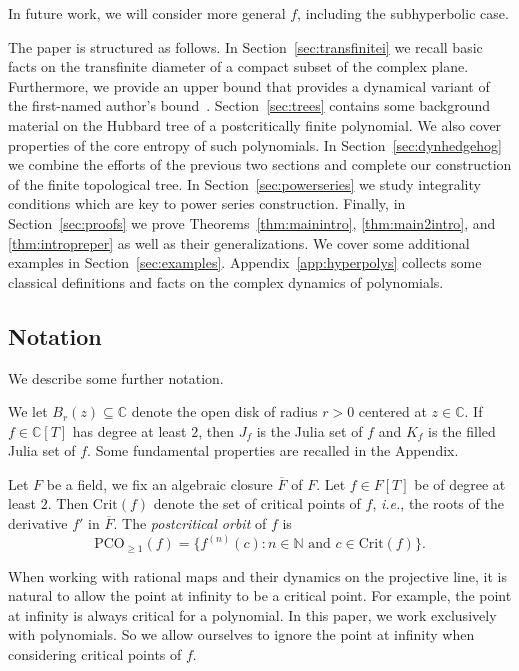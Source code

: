 \documentclass[12pt,oneside,a4]{amsart}
\newcommand{\IC}{\mathbb{C}}
\newcommand{\IN}{\mathbb{N}}
\numberwithin{maincounter}{section}
\numberwithin{equation}{section}
\renewcommand{\subset}{\subseteq}
\newcommand{\crit}[1]{\mathrm{Crit}({#1})}
\newcommand{\pco}{\mathrm{PCO}}
\begin{document}
In future work, we will consider more general $f$, including the
subhyperbolic case.


The paper is structured as follows. In Section~\ref{sec:transfinitei}
we recall basic facts on the transfinite diameter of a compact subset
of the complex plane. Furthermore, we provide an upper bound that
provides a dynamical variant of the first-named author's
bound~\cite{hab:dubinin}. Section~\ref{sec:trees} contains some
background material on the Hubbard tree of a postcritically finite
polynomial. We also cover properties of the core entropy of such
polynomials. In Section~\ref{sec:dynhedgehog} we combine the efforts
of the previous two sections and complete our construction of the
finite topological tree. In Section~\ref{sec:powerseries} we study
integrality conditions which are key to power series construction.
Finally, in Section~\ref{sec:proofs} we prove
Theorems~\ref{thm:mainintro}, \ref{thm:main2intro}, and
\ref{thm:intropreper}
as well as their
generalizations. We cover some additional examples in
Section~\ref{sec:examples}.
Appendix~\ref{app:hyperpolys} collects some classical
definitions and facts on the complex dynamics of polynomials.

\subsection{Notation}
\label{sec:notation}

We describe some further notation.

We let $B_r(z)\subset\IC$ denote the open disk of radius $r>0$
centered at $z\in\IC$.
If $f\in\IC[T]$ has degree at least $2$, then $J_f$ is the Julia set
of $f$ and $K_f$ is the filled Julia set of $f$. Some fundamental
properties are recalled in the Appendix. 


Let $F$ be a field, we  fix an algebraic closure $\overline F$ of $F$.
Let $f\in F[T]$ be of degree at least $2$.  Then $\crit{f}$
denote the set of critical points of $f$, \textit{i.e.}, the roots of
the derivative $f'$ in $\overline F$. The \textit{postcritical
orbit} of $f$ is
\begin{equation}
  \label{def:pcoge1}
  \pco_{\ge 1}(f) = \{f^{(n)}(c) : n\in \IN\text{ and } c\in \crit{f}\}.
\end{equation}

When working with rational maps and their dynamics on the projective
line, it is natural to allow the point at infinity to be a critical
point. For example, the point at infinity is always critical for a
polynomial. In this paper, we work exclusively with polynomials. So we
allow ourselves to ignore the point at infinity when considering
critical points of $f$.
\end{document}
